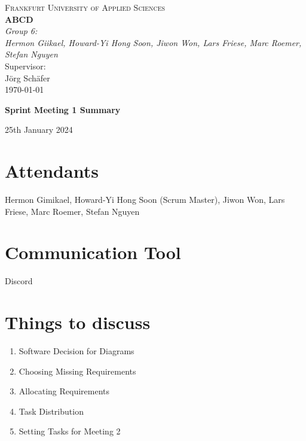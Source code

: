 \documentclass{article}
\begin{document}
\begin{titlepage}
    \centering
    \vspace*{0cm}
    {\scshape\Large Frankfurt University of Applied Sciences}\\[3cm]
    {\huge\bfseries ABCD}\\[8cm]
    {\Large\itshape Group 6:}\\
    {\Large\itshape Hermon Giikael, Howard-Yi Hong Soon, Jiwon Won, Lars Friese, Marc Roemer, Stefan Nguyen}\\[4cm]
    Supervisor:\\
    Jörg Schäfer\\[3cm]
    {\large \today}
\end{titlepage}

\tableofcontents
\newpage


\begin{center}
    {\Large \textbf{Sprint Meeting 1 Summary}}
    
    \vspace{0.5cm}
    
    {\large 25th January 2024}
\end{center}

\section*{Attendants}
Hermon Gimikael, Howard-Yi Hong Soon (Scrum Master), Jiwon Won, Lars Friese, Marc Roemer, Stefan Nguyen

\section*{Communication Tool}
Discord

\section*{Things to discuss}
\begin{enumerate}
    \item Software Decision for Diagrams
    \item Choosing Missing Requirements
    \item Allocating Requirements
    \item Task Distribution
    \item Setting Tasks for Meeting 2
\end{enumerate}
\end{document}
